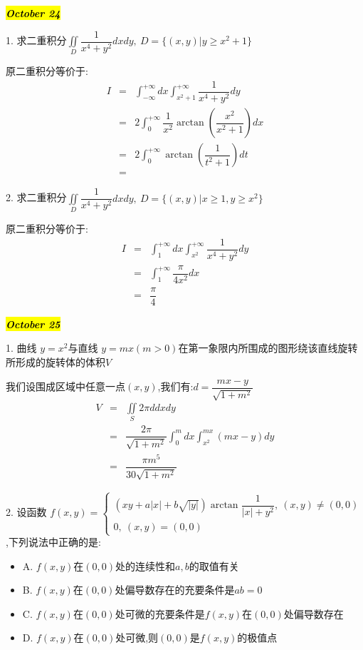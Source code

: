 \hl{\textbf{\textit{October 24}}}

1. 求二重积分$\iint\limits_{D}\dfrac{1}{x^4+y^2}dxdy,\ D=\{(x,y)|y\geq x^2+1\}$
\begin{solution}

	原二重积分等价于:
	\begin{eqnarray*}
		I&=&\int_{-\infty}^{+\infty}dx\int_{x^2+1}^{+\infty}\dfrac{1}{x^4+y^2}dy\\
		&=&2\int_{0}^{+\infty}\dfrac{1}{x^2}\arctan(\dfrac{x^2}{x^2+1})dx\\
		&=&2\int_{0}^{+\infty}\arctan(\dfrac{1}{t^2+1})dt\\
		&=&
	\end{eqnarray*}
\end{solution}

2. 求二重积分$\iint\limits_{D}\dfrac{1}{x^4+y^2}dxdy,\ D=\{(x,y)|x\geq 1,y\geq x^2\}$
\begin{solution}

	原二重积分等价于:
	\begin{eqnarray*}
		I&=&\int_{1}^{+\infty}dx\int_{x^2}^{+\infty}\dfrac{1}{x^4+y^2}dy\\
		&=&\int_{1}^{+\infty}\dfrac{\pi}{4x^2}dx\\
		&=&\dfrac{\pi}{4}
	\end{eqnarray*}
\end{solution}

\hl{\textbf{\textit{October 25}}}

1. 曲线 $y=x^2$与直线 $y=mx(m>0)$在第一象限内所围成的图形绕该直线旋转所形成的旋转体的体积$V$
\begin{solution}

	我们设围成区域中任意一点$(x,y)$,我们有:$d=\dfrac{mx-y}{\sqrt{1+m^2}}$
	\begin{eqnarray*}
		V&=&\iint\limits_{S}2\pi ddxdy\\
		&=&\dfrac{2\pi}{\sqrt{1+m^2}}\int_{0}^{m}dx\int_{x^2}^{mx}(mx-y)dy\\
		&=&\dfrac{\pi m^5}{30\sqrt{1+m^2}}
	\end{eqnarray*}
\end{solution}

2. 设函数 $f(x,y)=\left\lbrace 
\begin{array}{l}
	(xy+a|x|+b\sqrt{|y|})\arctan \dfrac{1}{|x|+y^2},\ (x,y)\neq (0,0)\\
	0,\ (x,y)=(0,0)
\end{array}
\right. $,下列说法中正确的是:  
\begin{itemize}
	\item A. $f(x,y)$在$(0,0)$处的连续性和$a,b$的取值有关
	\item B. $f(x,y)$在$(0,0)$处偏导数存在的充要条件是$ab=0$
	\item C. $f(x,y)$在$(0,0)$处可微的充要条件是$f(x,y)$在$(0,0)$处偏导数存在
	\item D. $f(x,y)$在$(0,0)$处可微,则$(0,0)$是$f(x,y)$的极值点
\end{itemize}
\begin{solution}
	
\end{solution}

